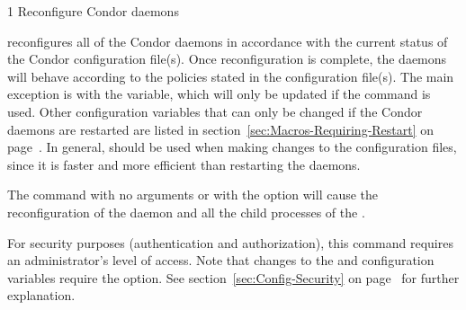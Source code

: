 \begin{ManPage}{\label{man-condor-reconfig}}{1}
{Reconfigure Condor daemons}
\Synopsis {}
\ToolArgsBase

\ToolDebugOption
\ToolArgsLocate
\ToolArgsAffect
{}

\ToolDebugOption
\ToolWhere
\ToolArgsAffect
{}


\Description 

 reconfigures all of the Condor daemons in accordance with 
the current
status of the Condor configuration file(s).  
Once reconfiguration is complete, the daemons will behave according to
the policies stated in the configuration file(s).
The main exception is with the  variable,
which will only be
updated if the  command is used.  
Other configuration variables that can only be changed
if the Condor daemons are restarted are listed in
section~\ref{sec:Macros-Requiring-Restart}
on page~\pageref{sec:Macros-Requiring-Restart}.
In general,  should be used when making changes to
the configuration files, since it is faster and more efficient than
restarting the daemons.

The command 
with no arguments or with the  option 
will cause the reconfiguration of the 
daemon and all the child processes of the .

For security purposes (authentication and authorization),
this command requires an administrator's level of access.
Note that changes to the  and
 configuration variables require the 
 option.
See
section~\ref{sec:Config-Security} on page~\pageref{sec:Config-Security}
for further explanation.

\begin{Options}
    \ToolArgsBaseDesc
    \ToolDebugDesc
    \ToolArgsLocateDesc
    \ToolArgsAffectDesc
\end{Options}

\ExitStatus


\end{ManPage}
